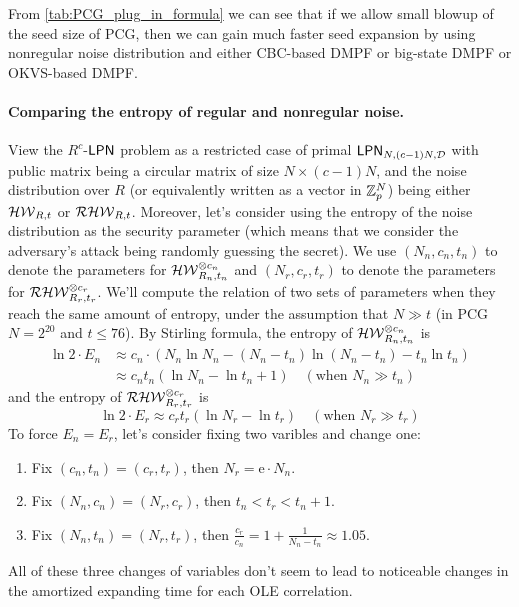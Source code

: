
From \cref{tab:PCG_plug_in_formula} we can see that if we allow small blowup of the seed size of PCG, then we can gain much faster seed expansion by using nonregular noise distribution and either CBC-based DMPF or big-state DMPF or OKVS-based DMPF. 

\paragraph{Comparing the entropy of regular and nonregular noise.}View the $R^c$-${\sf LPN}$ problem as a restricted case of primal ${\sf LPN}_{N, (c-1)N, \mathcal{D}}$ with public matrix being a circular matrix of size $N\times (c-1)N$, and the noise distribution over $R$ (or equivalently written as a vector in $\mathbb{Z}_p^N$) being either $\mathcal{HW}_{R, t}$ or $\mathcal{RHW}_{R,t}$. Moreover, let's consider using the entropy of the noise distribution as the security parameter (which means that we consider the adversary's attack being randomly guessing the secret). We use $(N_n, c_n, t_n)$ to denote the parameters for $\mathcal{HW}^{\otimes c_n}_{R_n, t_n}$ and $(N_r, c_r, t_r)$ to denote the parameters for $\mathcal{RHW}^{\otimes c_r}_{R_r, t_r}$. We'll compute the relation of two sets of parameters when they reach the same amount of entropy, under the assumption that $N\gg t$ (in PCG $N = 2^{20}$ and $t\le 76$). By Stirling formula, the entropy of $\mathcal{HW}^{\otimes c_n}_{R_n, t_n}$ is 
\[
  \begin{split}
    \ln 2 \cdot E_n &\approx c_n\cdot \left(N_n\ln N_n - (N_n-t_n)\ln(N_n-t_n) - t_n\ln t_n\right) \\&\approx c_n t_n\left(\ln N_n - \ln t_n + 1\right) \quad(\text{when }N_n\gg t_n)
  \end{split}\]
and the entropy of $\mathcal{RHW}^{\otimes c_r}_{R_r, t_r}$ is 
\[
    \ln 2\cdot E_r \approx c_rt_r\left(\ln N_r - \ln t_r\right) \quad(\text{when }N_r\gg t_r)
\]
To force $E_n = E_r$, let's consider fixing two varibles and change one: 
\begin{enumerate}
  \item Fix $(c_n, t_n) = (c_r, t_r)$, then $N_r = \mathrm{e}\cdot N_n$. 
  \item Fix $(N_n, c_n) = (N_r, c_r)$, then $t_n<t_r<t_n+1$. 
  \item Fix $(N_n, t_n) = (N_r, t_r)$, then $\frac{c_r}{c_n} = 1 + \frac{1}{N_n - t_n}\approx 1.05$. 
\end{enumerate}
All of these three changes of variables don't seem to lead to noticeable changes in the amortized expanding time for each OLE correlation. 

